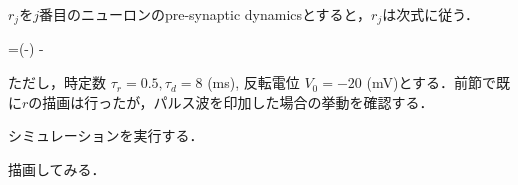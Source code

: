 $r_{j}$を$j$番目のニューロンのpre-synaptic dynamicsとすると，$r_{j}$は次式に従う．


=\left(-\right) -


ただし，時定数 $\tau_r=0.5, \tau_d = 8$ (ms), 反転電位 $V_0 = -20$ (mV)とする．前節で既に$r$の描画は行ったが，パルス波を印加した場合の挙動を確認する．

シミュレーションを実行する．

描画してみる．


